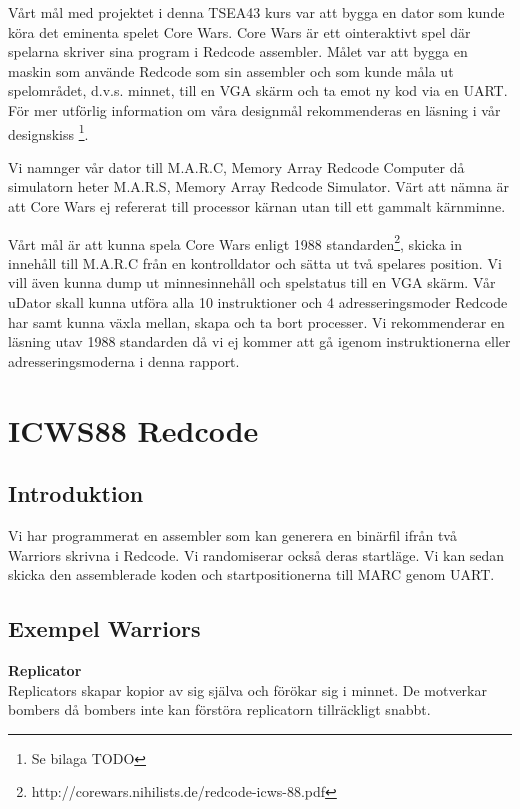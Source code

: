 \documentclass[11pt]{article}
\begin{document}
Vårt mål med projektet i denna TSEA43 kurs var att bygga en dator som kunde köra det eminenta spelet Core Wars. Core Wars är ett ointeraktivt spel där spelarna skriver sina program i Redcode assembler. Målet var att bygga en maskin som använde Redcode som sin assembler och som kunde måla ut spelområdet, d.v.s. minnet, till en VGA skärm och ta emot ny kod via en UART. För mer utförlig information om våra designmål rekommenderas en läsning i vår designskiss \footnote{Se bilaga TODO}.

Vi namnger vår dator till M.A.R.C, Memory Array Redcode Computer då simulatorn heter M.A.R.S, Memory Array Redcode Simulator. Värt att nämna är att Core Wars ej refererat till processor kärnan utan till ett gammalt kärnminne.

Vårt mål är att kunna spela Core Wars enligt 1988 standarden\footnote{http://corewars.nihilists.de/redcode-icws-88.pdf}, skicka in innehåll till M.A.R.C från en kontrolldator och sätta ut två spelares position. Vi vill även kunna dump ut minnesinnehåll och spelstatus till en VGA skärm. Vår uDator skall kunna utföra alla 10 instruktioner och 4 adresseringsmoder Redcode har samt kunna växla mellan, skapa och ta bort processer. Vi rekommenderar en läsning utav 1988 standarden då vi ej kommer att gå igenom instruktionerna eller adresseringsmoderna i denna rapport.

\newpage

\section{ICWS88 Redcode}

\subsection{Introduktion}
Vi har programmerat en assembler som kan generera en binärfil ifrån två Warriors skrivna i Redcode. Vi randomiserar också deras startläge. Vi kan sedan skicka den assemblerade koden och startpositionerna till MARC genom UART.

\subsection{Exempel Warriors}

\textbf{Replicator} \\
Replicators skapar kopior av sig själva och förökar sig i minnet. De motverkar bombers då bombers inte kan förstöra replicatorn tillräckligt snabbt.
\end{document}

